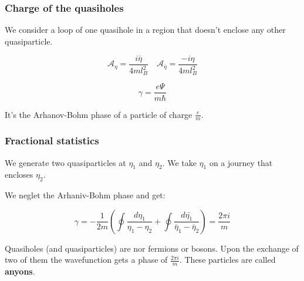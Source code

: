 \documentclass{beamer}
\begin{document}
\begin{frame}
\frametitle{Charge of the quasiholes}
\begin{center}

We consider a loop of one quasihole in a region that doesn't enclose any other quasiparticle.

\[
\mathcal{A}_{\eta} = \frac{i \bar{\eta}}{4 m l_B^2}
\quad
\mathcal{A}_{\bar{\eta}} = \frac{-i \eta}{4 m l_B^2}
\]

\[
\gamma = \frac{e \Psi}{m \hbar}
\]

It's the Arhanov-Bohm phase of a particle of charge $\frac{e}{m}$.

\end{center}
\end{frame}


\begin{frame}
\frametitle{Fractional statistics}
\begin{center}
We generate two quasiparticles at $\eta_1$ and $\eta_2$. We take $\eta_1$ on a journey that encloses $\eta_2$.

We neglet the Arhaniv-Bohm phase and get:

\[
\gamma = - \frac{1}{2 m} \left( \oint \frac{d \eta_1}{\eta_1 - \eta_2} + \oint \frac{d \bar{\eta_1}}{\bar{\eta}_1 - \bar{\eta}_2} \right) = \frac{2 \pi i}{m}
\]

Quasiholes (and quasiparticles) are nor fermions or bosons. Upon the exchange of two of them the wavefunction gets a phase of $\frac{2 \pi i}{m}$. These particles are called \textbf{anyons}.


\end{center}
\end{frame}
\end{document}
